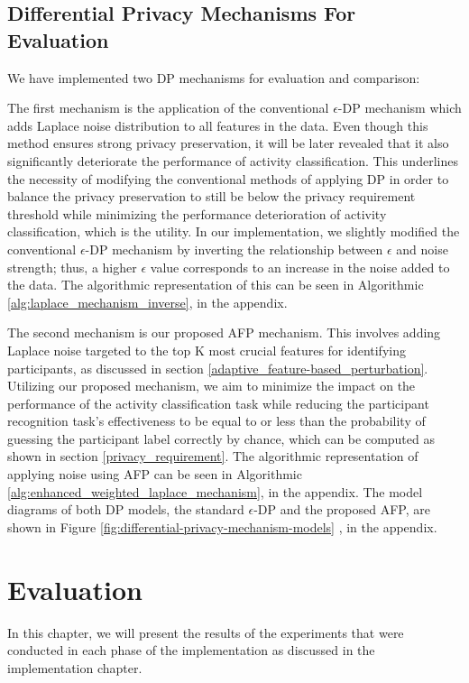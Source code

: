 \documentclass{l4proj}
\begin{document}
\section{Differential Privacy Mechanisms For Evaluation}
We have implemented two DP mechanisms for evaluation and comparison:

The first mechanism is the application of the conventional $\epsilon$-DP mechanism which adds Laplace noise distribution to all features in the data. Even though this method ensures strong privacy preservation, it will be later revealed that it also significantly deteriorate the performance of activity classification. This underlines the necessity of modifying the conventional methods of applying DP in order to balance the privacy preservation to still be below the privacy requirement threshold while minimizing the performance deterioration of activity classification, which is the utility. In our implementation, we slightly modified the conventional $\epsilon$-DP mechanism by inverting the relationship between $\epsilon$ and noise strength; thus, a higher $\epsilon$ value corresponds to an increase in the noise added to the data. The algorithmic representation of this can be seen in Algorithmic \ref{alg:laplace_mechanism_inverse}, in the appendix. 

The second mechanism is our proposed AFP mechanism. This involves adding Laplace noise targeted to the top K most crucial features for identifying participants, as discussed in section \ref{adaptive_feature-based_perturbation}. Utilizing our proposed mechanism, we aim to minimize the impact on the performance of the activity classification task while reducing the participant recognition task's effectiveness to be equal to or less than the probability of guessing the participant label correctly by chance, which can be computed as shown in section \ref{privacy_requirement}. The algorithmic representation of applying noise using AFP can be seen in Algorithmic \ref{alg:enhanced_weighted_laplace_mechanism}, in the appendix. The model diagrams of both DP models, the standard $\epsilon$-DP and the proposed AFP, are shown in Figure \ref{fig:differential-privacy-mechanism-models} , in the appendix.

\chapter{Evaluation} 
In this chapter, we will present the results of the experiments that were conducted in each phase of the implementation as discussed in the implementation chapter.
\end{document}
